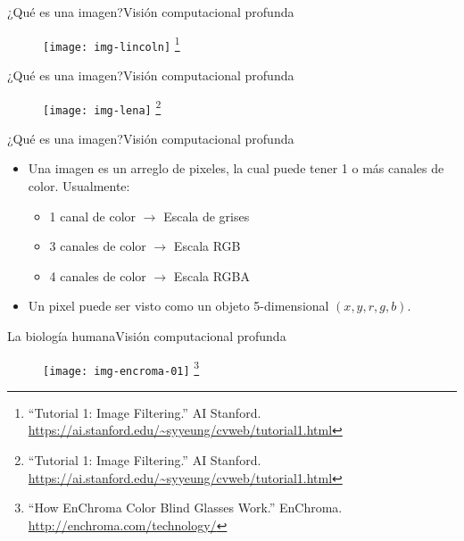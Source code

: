 \documentclass[10pt,border=3pt,tikz]{beamer}
\begin{document}
    \begin{frame}{¿Qué es una imagen?}{Visión computacional profunda}
        \begin{figure}
            \centering
            \texttt{[image: img-lincoln]}
            \let\thefootnote\relax\footnote{{\tiny “Tutorial 1: Image Filtering.” AI Stanford. \url{https://ai.stanford.edu/~syyeung/cvweb/tutorial1.html}}}
        \end{figure}
    \end{frame}
    
    \begin{frame}{¿Qué es una imagen?}{Visión computacional profunda}
        \begin{figure}
            \centering
            \texttt{[image: img-lena]}
            \let\thefootnote\relax\footnote{{\tiny “Tutorial 1: Image Filtering.” AI Stanford. \url{https://ai.stanford.edu/~syyeung/cvweb/tutorial1.html}}}
        \end{figure}
    \end{frame}
    
    \begin{frame}{¿Qué es una imagen?}{Visión computacional profunda}
        \begin{itemize}
            \item Una imagen es un arreglo de pixeles, la cual puede tener 1 o más canales de color. Usualmente:
            \begin{itemize}
                \item 1 canal de color $\rightarrow$ Escala de grises
                \item 3 canales de color $\rightarrow$ Escala RGB
                \item 4 canales de color $\rightarrow$ Escala RGBA
            \end{itemize}
            \item Un pixel puede ser visto como un objeto 5-dimensional $(x, y, r, g, b)$.
        \end{itemize}
    \end{frame}
    
    \begin{frame}{La biología humana}{Visión computacional profunda}
        \begin{figure}
            \centering
            \texttt{[image: img-encroma-01]}
            \let\thefootnote\relax\footnote{{\tiny “How EnChroma Color Blind Glasses Work.” EnChroma. \url{http://enchroma.com/technology/}}}
        \end{figure}
    \end{frame}
    
\end{document}
